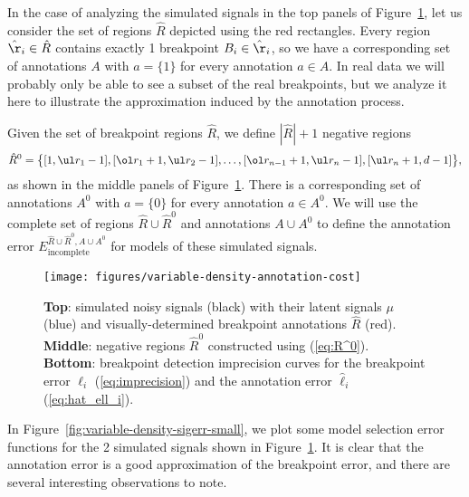 \documentclass{article}
\begin{document}
\newpage 

In the case of analyzing the simulated signals in the top panels of
Figure~\ref{fig:variable-density-annotation-cost}, let us consider the
set of regions $\hat R$ depicted using the red rectangles. Every
region $\hat\r_i\in\hat R$ contains exactly 1 breakpoint
$B_i\in\hat\r_i$, so we have a corresponding set of annotations
$ A$ with $a=\{1\}$ for every annotation $a\in A$. In real data we
will probably only be able to see a subset of the real breakpoints,
but we analyze it here to illustrate the approximation induced by the
annotation process.

Given the set of breakpoint regions $\hat R$, we define $|\hat R|+1$
negative regions
\begin{equation}
  \label{eq:R^0}
  \hat R^0 = \big\{ 
[1,\ul r_1-1],
[\ol r_1+1, \ul r_2-1],
\dots,
[\ol r_{n-1}+1,\ul r_n-1],
[\ul r_n+1,d-1]
\big\},
\end{equation}
as shown in the middle panels of
Figure~\ref{fig:variable-density-annotation-cost}. There is a
corresponding set of annotations $A^0$ with $a=\{0\}$ for every
annotation $a\in A^0$. We will use the complete set of regions $\hat
R\cup \hat R^0$ and annotations $A\cup A^0$ to define the
annotation error $E^{\hat R\cup\hat R^0,A\cup
  A^0}_{\text{incomplete}}$ for models of these simulated signals.


\begin{figure}[b!]
  \centering
\texttt{[image: figures/variable-density-annotation-cost]}
%
\vskip -0.1in
  \caption{\textbf{Top}: simulated noisy
  signals (black) with their latent signals $\mu$ (blue) and
  visually-determined breakpoint annotations $\hat R$
  (red). 
\protect\\
\textbf{Middle}: negative regions $\hat R^0$ constructed
  using (\ref{eq:R^0}).
\protect\\
\textbf{Bottom}: breakpoint detection
  imprecision curves for the breakpoint error $\ell_i$
  (\ref{eq:imprecision}) and the annotation error $\hat
  \ell_i$ (\ref{eq:hat_ell_i}).}
\label{fig:variable-density-annotation-cost}
\end{figure}


In Figure~\ref{fig:variable-density-sigerr-small}, we plot some model
selection error functions for the 2 simulated signals shown in
Figure~\ref{fig:variable-density-annotation-cost}. It is clear that
the annotation error is a good approximation of the breakpoint error,
and there are several interesting observations to note. 
\end{document}
